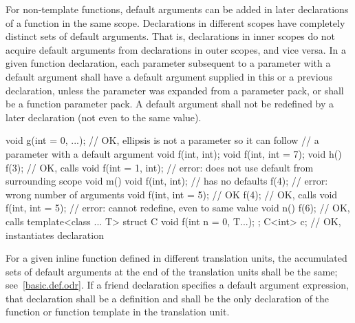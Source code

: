 \pnum
For non-template functions, default arguments can be added in later
declarations of a
function in the same scope.
Declarations in different
scopes have completely distinct sets of default arguments.
That
is, declarations in inner scopes do not acquire default
arguments from declarations in outer scopes, and vice versa.
In
a given function declaration, each parameter subsequent to a
parameter with a default argument shall have a default argument
supplied in this or a previous declaration,
unless the parameter was expanded from a parameter pack,
or shall be a function parameter pack.
A default argument
shall not be redefined by a later declaration (not even to the
same value).
\begin{example}

\begin{codeblock}
void g(int = 0, ...);           // OK, ellipsis is not a parameter so it can follow
                                // a parameter with a default argument
void f(int, int);
void f(int, int = 7);
void h() {
  f(3);                         // OK, calls 
  void f(int = 1, int);         // error: does not use default from surrounding scope
}
void m() {
  void f(int, int);             // has no defaults
  f(4);                         // error: wrong number of arguments
  void f(int, int = 5);         // OK
  f(4);                         // OK, calls 
  void f(int, int = 5);         // error: cannot redefine, even to same value
}
void n() {
  f(6);                         // OK, calls 
}
template<class ... T> struct C {
  void f(int n = 0, T...);
};
C<int> c;                       // OK, instantiates declaration 
\end{codeblock}
\end{example}
For a given inline function defined in different translation units,
the accumulated sets of default arguments at the end of the
translation units shall be the same;
see~\ref{basic.def.odr}.
If a friend declaration specifies a default argument expression,
that declaration shall be a definition and shall be the only
declaration of the function or function template in the translation unit.

